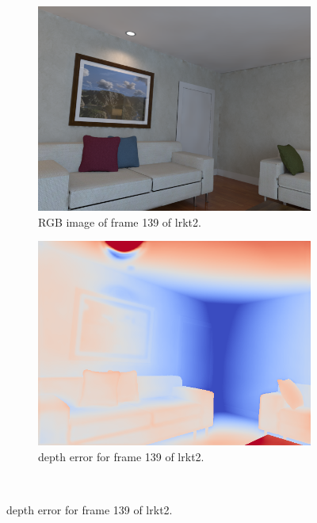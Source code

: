         \begin{figure}[ht]
            \centering
            \begin{subfigure}[b]{.48\textwidth}
                \includegraphics[width=\textwidth]{images/frame_000139.png}
                \caption{RGB image of frame 139 of lrkt2.}
                \label{sfig:frame1}
            \end{subfigure}
            \begin{subfigure}[b]{.48\textwidth}
                \includegraphics[width=\textwidth]{images/error_000139.png}
                \caption{depth error for frame 139 of lrkt2.}
                \label{sfig:error1}
            \end{subfigure}\\

\end{figure}
